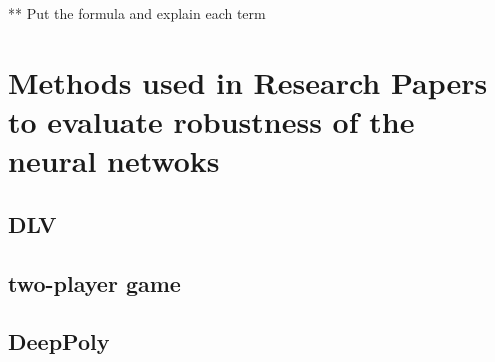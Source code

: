  
** Put the formula and explain each term
















\section{Methods used in Research Papers to evaluate robustness of the neural netwoks}
\subsection {DLV}
\subsection {two-player game}
\subsection {DeepPoly}

